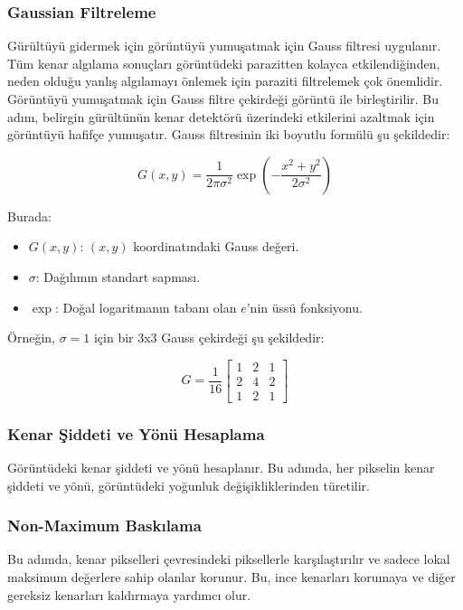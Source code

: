 \documentclass[12pt]{article}
\begin{document}
 \subsubsection{Gaussian Filtreleme}
Gürültüyü gidermek için görüntüyü yumuşatmak için Gauss filtresi uygulanır. Tüm kenar algılama sonuçları görüntüdeki parazitten kolayca etkilendiğinden, neden olduğu yanlış algılamayı önlemek için paraziti filtrelemek çok önemlidir. Görüntüyü yumuşatmak için Gauss filtre çekirdeği görüntü ile birleştirilir. Bu adım, belirgin gürültünün kenar detektörü üzerindeki etkilerini azaltmak için görüntüyü hafifçe yumuşatır.
Gauss filtresinin iki boyutlu formülü şu şekildedir:

\begin{equation}
G(x, y) = \frac{1}{2\pi\sigma^2} \exp\left(-\frac{x^2 + y^2}{2\sigma^2}\right)
\end{equation}

Burada:
\begin{itemize}
    \item \( G(x, y) \): \( (x, y) \) koordinatındaki Gauss değeri.
    \item \( \sigma \): Dağılımın standart sapması.
    \item \( \exp \): Doğal logaritmanın tabanı olan \( e \)'nin üssü fonksiyonu.
\end{itemize}

Örneğin, \(\sigma = 1\) için bir 3x3 Gauss çekirdeği şu şekildedir:

\begin{equation}
G = \frac{1}{16} \begin{bmatrix}
1 & 2 & 1 \\
2 & 4 & 2 \\
1 & 2 & 1 
\end{bmatrix}
\end{equation}
\subsubsection{Kenar Şiddeti ve Yönü Hesaplama}
Görüntüdeki kenar şiddeti ve yönü hesaplanır. Bu adımda, her pikselin kenar şiddeti ve yönü, görüntüdeki yoğunluk değişikliklerinden türetilir.
\subsubsection{Non-Maximum Baskılama}
Bu adımda, kenar pikselleri çevresindeki piksellerle karşılaştırılır ve sadece lokal maksimum değerlere sahip olanlar korunur. Bu, ince kenarları korumaya ve diğer gereksiz kenarları kaldırmaya yardımcı olur.
\end{document}

